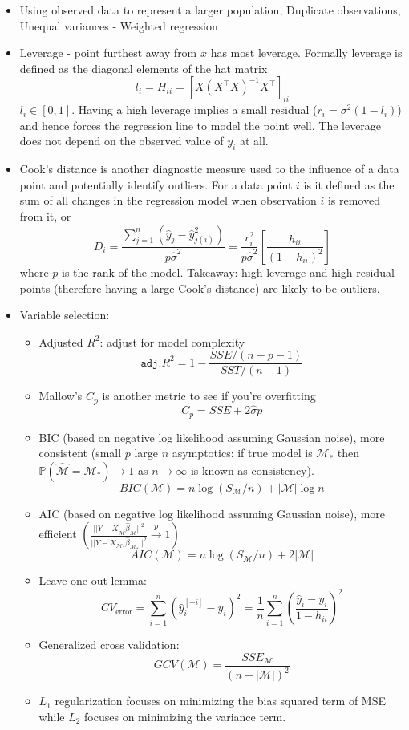 \documentclass{article}
\begin{document}
\begin{itemize}
\begin{itemize}
\begin{itemize}
        \end{itemize}
    \end{itemize}
  \item Using observed data to represent a larger population, Duplicate observations, Unequal variances - Weighted regression
  \item Leverage - point furthest away from $\bar{x}$ has most leverage. Formally leverage is defined as the diagonal elements of the hat matrix
    \[l_i = H_{ii} = [X(X^\top X )^{-1} X^\top]_{ii}\]
    $l_i \in [0, 1]$. Having a high leverage implies a small residual ($r_i = \sigma^2 (1-l_i)$) and hence forces the regression line to model the point well.
    The leverage does not depend on the observed value of $y_i$ at all.
  \item Cook's distance is another diagnostic measure used to the influence of a data point and potentially identify outliers. For a
    data point $i$ is it defined as the sum of all changes in the regression model when observation $i$ is removed from it, or
    \[ D_i = \frac{\sum_{j=1}^{n} (\hat{y}_j - \hat{y}_{j(i)}^2)}{p \hat{\sigma}^2} = \frac{r_i^2}{p \hat{\sigma}^2}\left[\frac{h_{ii}}{(1 - h_{ii})^2}\right] \]
    where $p$ is the rank of the model. Takeaway: high leverage and high residual points (therefore having a large Cook's distance) are likely to be outliers.
  \item Variable selection:
    \begin{itemize}
      \item Adjusted $R^2$: adjust for model complexity
        \[ \mathtt{adj. }R^2 = 1 - \frac{SSE/(n - p -1)}{SST/(n-1)} \]
      \item Mallow's $C_p$ is another metric to see if you're overfitting
        \[C_p = SSE + 2 \hat{\sigma}p\]
      \item BIC (based on negative log likelihood assuming Gaussian noise), more consistent (small $p$ large $n$ asymptotics: if true model is $\mathcal{M}_*$ then $\mathbb{P}(\hat{\mathcal{M}} = \mathcal{M}_*) \rightarrow 1$ as $n \rightarrow \infty$ is known as consistency).
        \[BIC(\mathcal{M}) = n \log (S_{\mathcal{M}}/n) + |\mathcal{M}| \log n\]
      \item AIC (based on negative log likelihood assuming Gaussian noise), more efficient $\left(\frac{||Y - X_{\hat{\mathcal{M}}} \hat{\beta}_{\hat{\mathcal{M}}}||^2}{||Y - X_{\mathcal{M}_*} \hat{\beta}_{\mathcal{M}_*}||^2} \xrightarrow{p} 1\right)$
        \[AIC(\mathcal{M}) = n \log (S_{\mathcal{M}}/n) + 2|\mathcal{M}|\]
      \item Leave one out lemma:
        \[ CV_{\text{error}} = \sum_{i=1}^{n} (\hat{y}_i^{[-i]} - y_i)^2 = \frac{1}{n} \sum_{i=1}^{n} \left(\frac{\hat{y}_i - y_i}{1 - h_{ii}}\right)^2\]
      \item Generalized cross validation:
        \[ GCV(\mathcal{M}) = \frac{SSE_{\mathcal{M}}}{(n - |\mathcal{M}|)^2} \]
      \item $L_1$ regularization focuses on minimizing the bias squared term of MSE while $L_2$ focuses on minimizing the variance term.
    \end{itemize}
\end{itemize}
\end{document}
